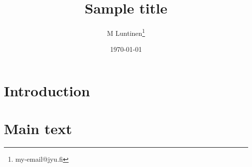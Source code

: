 \documentclass{article}
\title{Sample title}
\author{M Luntinen\thanks{my-email@jyu.fi}}
\date{\today}
\begin{document}
\maketitle
    
        \section{Introduction}
        \blindtext

        \blindtext
        \section{Main text}

        \blindtext

        \blindtext
\end{document}
